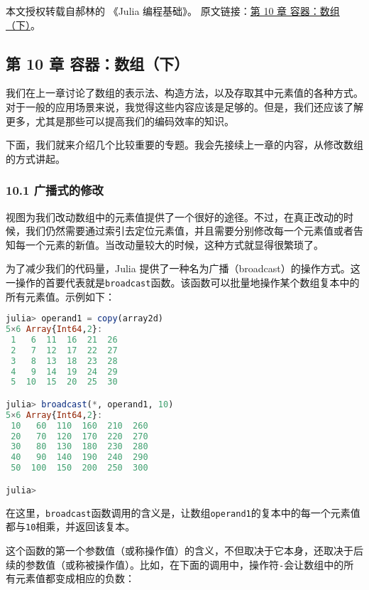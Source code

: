 
本文授权转载自郝林的 《Julia 编程基础》。 原文链接：\href{https://github.com/hyper0x/JuliaBasics/blob/master/book/ch10.md}{第 10 章 容器：数组（下）}。


\subsection{第 10 章 容器：数组（下）}

我们在上一章讨论了数组的表示法、构造方法，以及存取其中元素值的各种方式。对于一般的应用场景来说，我觉得这些内容应该是足够的。但是，我们还应该了解更多，尤其是那些可以提高我们的编码效率的知识。

下面，我们就来介绍几个比较重要的专题。我会先接续上一章的内容，从修改数组的方式讲起。

\subsubsection{10.1 广播式的修改}

视图为我们改动数组中的元素值提供了一个很好的途径。不过，在真正改动的时候，我们仍然需要通过索引去定位元素值，并且需要分别修改每一个元素值或者告知每一个元素的新值。当改动量较大的时候，这种方式就显得很繁琐了。

为了减少我们的代码量，Julia 提供了一种名为广播（broadcast）的操作方式。这一操作的首要代表就是\verb|broadcast|函数。该函数可以批量地操作某个数组复本中的所有元素值。示例如下：

\begin{lstlisting}[language=julia]
julia> operand1 = copy(array2d)
5×6 Array{Int64,2}:
 1   6  11  16  21  26
 2   7  12  17  22  27
 3   8  13  18  23  28
 4   9  14  19  24  29
 5  10  15  20  25  30

julia> broadcast(*, operand1, 10)
5×6 Array{Int64,2}:
 10   60  110  160  210  260
 20   70  120  170  220  270
 30   80  130  180  230  280
 40   90  140  190  240  290
 50  100  150  200  250  300

julia> 
\end{lstlisting}

在这里，\verb|broadcast|函数调用的含义是，让数组\verb|operand1|的复本中的每一个元素值都与\verb|10|相乘，并返回该复本。

这个函数的第一个参数值（或称操作值）的含义，不但取决于它本身，还取决于后续的参数值（或称被操作值）。比如，在下面的调用中，操作符\verb|-|会让数组中的所有元素值都变成相应的负数：

